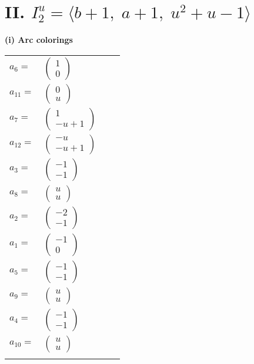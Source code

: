 \documentclass[1p]{elsarticle_modified}
\theoremstyle{definition}
\begin{document}
\centering \section*{II. $I^u_{2}= \langle b+1,\;a+1,\;u^2+u-1 \rangle$}
\flushleft \textbf{(i) Arc colorings}\\
\begin{tabular}{m{7pt} m{180pt} m{7pt} m{180pt} }
\flushright $a_{6}=$&$\begin{pmatrix}1\\0\end{pmatrix}$ \\
\flushright $a_{11}=$&$\begin{pmatrix}0\\u\end{pmatrix}$ \\
\flushright $a_{7}=$&$\begin{pmatrix}1\\- u+1\end{pmatrix}$ \\
\flushright $a_{12}=$&$\begin{pmatrix}- u\\- u+1\end{pmatrix}$ \\
\flushright $a_{3}=$&$\begin{pmatrix}-1\\-1\end{pmatrix}$ \\
\flushright $a_{8}=$&$\begin{pmatrix}u\\u\end{pmatrix}$ \\
\flushright $a_{2}=$&$\begin{pmatrix}-2\\-1\end{pmatrix}$ \\
\flushright $a_{1}=$&$\begin{pmatrix}-1\\0\end{pmatrix}$ \\
\flushright $a_{5}=$&$\begin{pmatrix}-1\\-1\end{pmatrix}$ \\
\flushright $a_{9}=$&$\begin{pmatrix}u\\u\end{pmatrix}$ \\
\flushright $a_{4}=$&$\begin{pmatrix}-1\\-1\end{pmatrix}$ \\
\flushright $a_{10}=$&$\begin{pmatrix}u\\u\end{pmatrix}$\\&\end{tabular}
\end{document}
